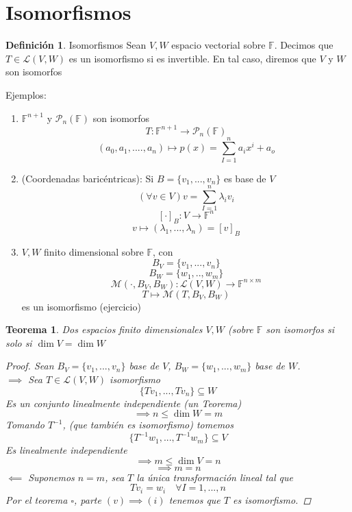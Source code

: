 \documentclass[11pt]{book}
\newtheorem{thm}{Teorema}[section]
\theoremstyle{definition}
\newtheorem{defn}{Definición}[section]
\begin{document}
\section{Isomorfismos}
\begin{defn}{Isomorfismos}
Sean $V,W$ espacio vectorial sobre $\mathbb{F}$. Decimos que $T\in\mathcal{L}(V,W)$ es un isomorfismo si es invertible. En tal caso, diremos que $V$ y $W$ son isomorfos
\end{defn}
Ejemplos:
\begin{enumerate}
	\item $\mathbb{F}^{n+1}$ y $\mathcal{P}_n(\mathbb{F})$ son isomorfos
	\[T:\mathbb{F}^{n+1}\rightarrow \mathcal{P}_n(\mathbb{F})\]
	\[(a_0,a_1,....,a_n)\mapsto p(x)=\sum^n_{I=1}a_ix^i+a_o\]
	
	\item (Coordenadas baricéntricas): Si $B=\{v_1,...,v_n\}$ es base de $V$
	\[(\forall v\in V)v=\sum^n_{I=1}\lambda_i v_i\]
	\[ [\cdot ]_B:V\rightarrow \mathbb{F}^n\]
	\[ v\mapsto(\lambda_1,...,\lambda_n)=[v]_B\]
	
	\item $V,W$ finito dimensional sobre $\mathbb{F}$, con
	\[B_V=\{v_1,...,v_n\}\]
	\[B_W=\{w_1,..,w_m\}\]
	\[\mathcal{M}(\cdot,B_V,B_W):\mathcal{L}(V,W)\rightarrow \mathbb{F}^{n\times m}\]
	\[T\mapsto\mathcal{M}(T,B_V,B_W)\]
	es un isomorfismo (ejercicio)
\end{enumerate}
\begin{thm}
Dos espacios finito dimensionales $V,W$ (sobre $\mathbb{F}$ son isomorfos si solo si $\dim V= \dim W$
\begin{proof}
Sean $B_V=\{v_1,...,v_n\}$ base de $V$, $B_W=\{w_1,...,w_m\}$ base de $W$.\\
$\implies$ Sea $T\in\mathcal{L}(V,W)$ isomorfismo
\[\{Tv_1,...,Tv_n\}\subseteq W\]
Es un conjunto linealmente independiente (un Teorema)
\[\implies n\leq \dim W=m\]
Tomando $T^{-1}$, (que también es isomorfismo) tomemos
\[\{T^{-1}w_1,...,T^{-1}w_m\}\subseteq V\]
Es linealmente independiente
\[\implies m\leq\dim V=n\]
\[\implies m=n\]
$\impliedby$ Suponemos $n=m$, sea $T$ la única transformación lineal tal que
\[Tv_i=w_i\quad\forall I=1,...,n\]
Por el teorema $\square$, parte $(v)\implies (i)$ tenemos que $T$ es isomorfismo.
\end{proof}
\end{thm}
\end{document}
